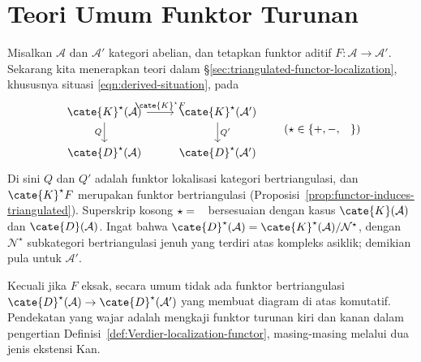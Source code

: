 
\section{Teori Umum Funktor Turunan}\label{sec:derived-functors}
\hypertarget{o014.aljabr2.chapter4.derived-functors-general}{ }

Misalkan $\mathcal{A}$ dan $\mathcal{A}'$ kategori abelian, dan tetapkan
funktor aditif $F:\mathcal{A}\to\mathcal{A}'$. Sekarang kita menerapkan teori
dalam \S\ref{sec:triangulated-functor-localization}, khususnya situasi
\eqref{eqn:derived-situation}, pada
\begin{equation*}\begin{tikzcd}
	\cate{K}^{\star}(\mathcal{A}) \arrow[r, "{\cate{K}^\star F}"] \arrow[d, "Q"'] & \cate{K}^{\star}(\mathcal{A}') \arrow[d, "{Q'}"] \\
	\cate{D}^{\star}(\mathcal{A}) & \cate{D}^{\star}(\mathcal{A}')
\end{tikzcd} \qquad (\star \in \{+, -, \hspace{0.8em}\}) \end{equation*}
Di sini $Q$ dan $Q'$ adalah funktor lokalisasi kategori bertriangulasi, dan
$\cate{K}^\star F$ merupakan funktor bertriangulasi
(Proposisi~\ref{prop:functor-induces-triangulated}). Superskrip kosong
$\star=\hspace{0.8em}$ bersesuaian dengan kasus $\cate{K}(\mathcal{A})$ dan
$\cate{D}(\mathcal{A})$. Ingat bahwa
$\cate{D}^{\star}(\mathcal{A})=\cate{K}^{\star}(\mathcal{A})/\mathcal{N}^{\star}$,
dengan $\mathcal{N}^{\star}$ subkategori bertriangulasi jenuh yang terdiri atas
kompleks asiklik; demikian pula untuk $\mathcal{A}'$.

Kecuali jika $F$ eksak, secara umum tidak ada funktor bertriangulasi
$\cate{D}^{\star}(\mathcal{A})\to\cate{D}^{\star}(\mathcal{A}')$ yang membuat
diagram di atas komutatif. Pendekatan yang wajar adalah mengkaji funktor
turunan kiri dan kanan dalam pengertian
Definisi~\ref{def:Verdier-localization-functor}, masing-masing melalui dua
jenis ekstensi Kan.

